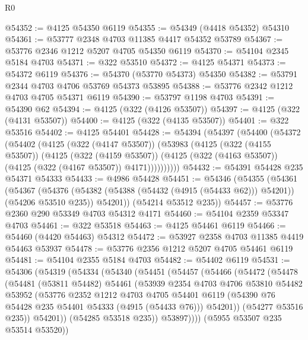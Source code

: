 \begin{lexlean}{R0}
\begin{coremodule}
@54352 := @4125 @54350 @6119
@54355 := @54349 (@4418 @54352) @54310
@54361 := @53777 @2348 @4703 @11385 @4417 @54352 @53789
@54367 := @53776 @2346 @1212 @5207 @4705 @54350 @6119
@54370 := @54104 @2345 @5184 @4703
@54371 := @322 @53510
@54372 := @4125 @54371
@54373 := @54372 @6119
@54376 := @54370 (@53770 @54373) @54350
@54382 := @53791 @2344 @4703 @4706 @53769 @54373 @53895
@54388 := @53776 @2342 @1212 @4703 @4705 @54371 @6119
@54390 := @53797 @1198 @4703
@54391 := @54390 @62
@54394 := @4125 (@322 (@4126 @53507))
@54397 := @4125 (@322 (@4131 @53507))
@54400 := @4125 (@322 (@4135 @53507))
@54401 := @322 @53516
@54402 := @4125 @54401
@54428 := @54394
    (@54397
      (@54400
        (@54372
          (@54402
            (@4125
              (@322 (@4147 @53507))
              (@53983
                (@4125
                  (@322 (@4155 @53507))
                  (@4125
                    (@322 (@4159 @53507))
                    (@4125 (@322 (@4163 @53507)) (@4125 (@322 (@4167 @53507)) @4171))))))))))
@54432 := @54391 @54428 @235 @54371 @54333
@54433 := @4986 @54428
@54451 := @54346
    (@54355
      (@54361
        (@54367
          (@54376 (@54382 (@54388 (@54432 (@4915 (@54433 @62))) @54201)) (@54206 @53510 @235))
          @54201))
      (@54214 @53512 @235))
@54457 := @53776 @2360 @290 @53349 @4703 @54312 @4171
@54460 := @54104 @2359 @53347 @4703
@54461 := @322 @53518
@54463 := @4125 @54461 @6119
@54466 := @54460 (@4420 @54463) @54312
@54472 := @53927 @2358 @4703 @11385 @4419 @54463 @53937
@54478 := @53776 @2356 @1212 @5207 @4705 @54461 @6119
@54481 := @54104 @2355 @5184 @4703
@54482 := @54402 @6119
@54531 := @54306
    (@54319
      (@54334
        (@54340
          (@54451
            (@54457
              (@54466
                (@54472
                  (@54478
                    (@54481
                      (@53811 @54482)
                      @54461
                      (@53939
                        @2354
                        @4703
                        @4706
                        @53810
                        @54482
                        @53952
                        (@53776
                          @2352
                          @1212
                          @4703
                          @4705
                          @54401
                          @6119
                          (@54390 @76 @54428 @235 @54401 @54333 (@4915 (@54433 @76)))
                          @54201))
                      (@54277 @53516 @235))
                    @54201))
                (@54285 @53518 @235))
              @53897))))
      (@5955 @53507 @235 @53514 @53520))

\end{coremodule}
\end{lexlean}

